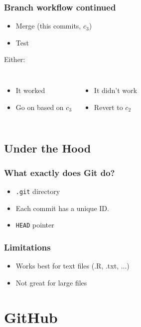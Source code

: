 \documentclass{beamer}
\begin{document}
\begin{frame}[fragile]
    \frametitle{Branch workflow continued}
    \begin{itemize}
        \item Merge (this commits, $c_3$)
        \item Test
    \end{itemize}
    \vspace{0.2cm}
    Either:
    \vspace{0.2cm}
    \begin{columns}
        \begin{itemize}
        \item It worked
        \item Go on based on $c_3$
        \end{itemize}
        \begin{itemize}
            \item It didn't work
            \item Revert to $c_2$
        \end{itemize}
    \end{columns}
\end{frame}

\subsection{Under the Hood}

\begin{frame}[fragile]
    \frametitle{What exactly does Git do?}
    \begin{itemize}
        \item \verb|.git| directory
        \item Each commit has a unique ID. 
        \item \verb|HEAD| pointer
    \end{itemize}
\end{frame}

\begin{frame}
    \frametitle{Limitations}
    \begin{itemize}
        \item Works best for text files (.R, .txt, ...)
        \item Not great for large files 
    \end{itemize}
\end{frame}

\section{GitHub}
\end{document}
